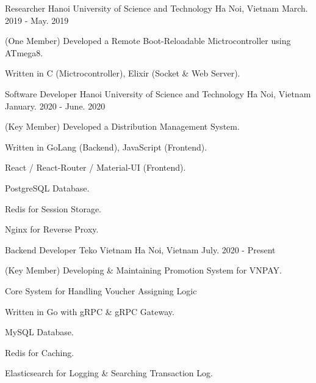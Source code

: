 \begin{cventries}

\cventry
{Researcher} %
{Hanoi University of Science and Technology} %
{Ha Noi, Vietnam} %
{March. 2019 - May. 2019} %
{ %
\begin{cvitems}
\item{(One Member) Developed a Remote Boot-Reloadable Mictrocontroller using ATmega8.}
\item{Written in C (Mictrocontroller), Elixir (Socket \& Web Server).}
\end{cvitems}
}


\cventry
{Software Developer} %
{Hanoi University of Science and Technology} %
{Ha Noi, Vietnam} %
{January. 2020 - June. 2020} %
{ %
\begin{cvitems}
\item{(Key Member) Developed a Distribution Management System.}
\item{Written in GoLang (Backend), JavaScript (Frontend).}
\item{React / React-Router / Material-UI (Frontend).}
\item{PostgreSQL Database.}
\item{Redis for Session Storage.}
\item{Nginx for Reverse Proxy.}
\end{cvitems}
}


\cventry
{Backend Developer} %
{Teko Vietnam} %
{Ha Noi, Vietnam} %
{July. 2020 - Present} %
{ %
\begin{cvitems}
\item{(Key Member) Developing \& Maintaining Promotion System for VNPAY.}
\item{Core System for Handling Voucher Assigning Logic}
\item{Written in Go with gRPC \& gRPC Gateway.}
\item{MySQL Database.}
\item{Redis for Caching.}
\item{Elasticsearch for Logging \& Searching Transaction Log.}
\end{cvitems}
}


\end{cventries}
